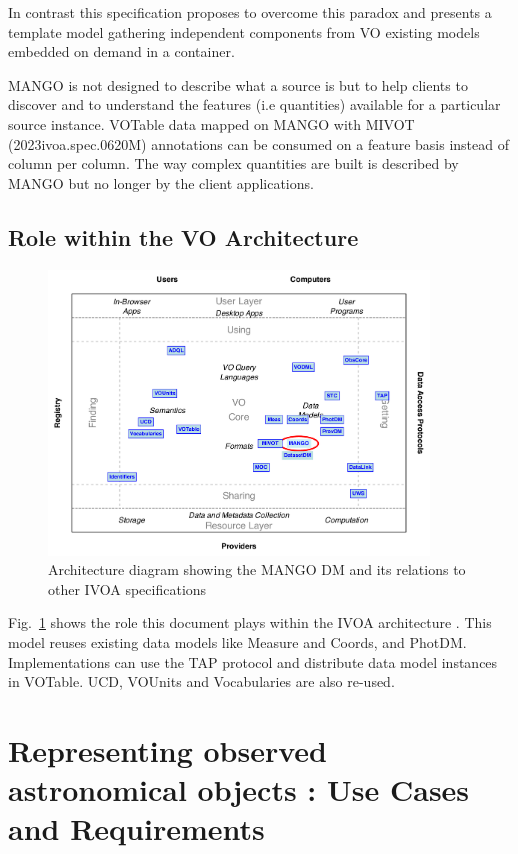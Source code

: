 \documentclass[11pt,a4paper]{ivoa}
\begin{document}
In contrast this specification proposes to overcome this paradox and presents a template model gathering independent
components from VO existing models embedded on demand in a container.

MANGO is not designed to describe what a source is but to help clients to discover and to understand
the features (i.e quantities) available for a particular source instance.
VOTable data mapped on MANGO with MIVOT (2023ivoa.spec.0620M) annotations can be consumed on a feature basis 
instead of column per column.
The way complex quantities are built is described by MANGO but no longer by the client applications.

\subsection{Role within the VO Architecture}

\begin{figure}
\centering

\includegraphics[width=0.9\textwidth]{role_diagram.pdf}
\caption{Architecture diagram showing the MANGO DM and its relations to other IVOA specifications}
\label{fig:archdiag}
\end{figure}

Fig.~\ref{fig:archdiag} shows the role this document plays within the
IVOA architecture \citep{2010ivoa.rept.1123A}. This model reuses existing data models like Measure and Coords, and PhotDM. Implementations can use the TAP protocol and distribute data model instances in VOTable. 
UCD, VOUnits and Vocabularies are also re-used.  

\section{Representing observed astronomical objects : Use Cases and  Requirements}
\end{document}
